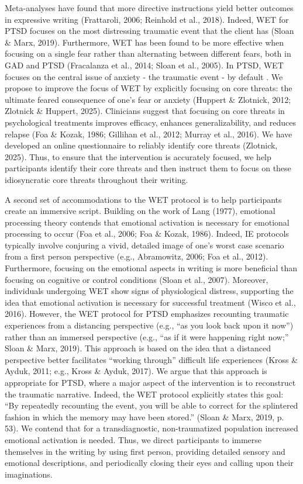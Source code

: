 \documentclass[
  man,floatsintext]{apa7}
\begin{document}
Meta-analyses have found that more directive instructions yield better outcomes in expressive writing (Frattaroli, 2006; Reinhold et al., 2018).
Indeed, WET for PTSD focuses on the most distressing traumatic event that the client has (Sloan \& Marx, 2019).
Furthermore, WET has been found to be more effective when focusing on a single fear rather than alternating between different fears, both in GAD and PTSD (Fracalanza et al., 2014; Sloan et al., 2005).
In PTSD, WET focuses on the central issue of anxiety - the traumatic event - by default .
We propose to improve the focus of WET by explicitly focusing on core threats: the ultimate feared consequence of one's fear or anxiety (Huppert \& Zlotnick, 2012; Zlotnick \& Huppert, 2025).
Clinicians suggest that focusing on core threats in psychological treatments improves efficacy, enhances generalizability, and reduces relapse
(Foa \& Kozak, 1986; Gillihan et al., 2012; Murray et al., 2016).
We have developed an online questionnaire to reliably identify core threats (Zlotnick, 2025).
Thus, to ensure that the intervention is accurately focused, we help participants identify their core threats and then instruct them to focus on these idiosyncratic core threats throughout their writing.

A second set of accommodations to the WET protocol is to help participants create an immersive script.
Building on the work of Lang (1977), emotional processing theory contends that
emotional activation is necessary for emotional processing to occur (Foa et al., 2006; Foa \& Kozak, 1986).
Indeed, IE protocols typically involve conjuring a vivid, detailed image of one's worst case scenario from a first person perspective (e.g., Abramowitz, 2006; Foa et al., 2012).
Furthermore, focusing on the emotional aspects in writing is more beneficial than focusing on cognitive or control conditions (Sloan et al., 2007).
Moreover, individuals undergoing WET show signs of physiological distress, supporting the idea that emotional activation is necessary for successful treatment (Wisco et al., 2016).
However, the WET protocol for PTSD emphasizes recounting traumatic experiences from a distancing perspective (e.g., ``as you look back upon it now'') rather than an immersed perspective (e.g., ``as if it were happening right now;'' Sloan \& Marx, 2019).
This approach is based on the idea that a distanced perspective better facilitates ``working through'' difficult life experiences (Kross \& Ayduk, 2011; e.g., Kross \& Ayduk, 2017).
We argue that this approach is appropriate for PTSD, where a major aspect of the intervention is to reconstruct the traumatic narrative.
Indeed, the WET protocol explicitly states this goal: ``By repeatedly recounting the event, you will be able to correct for the splintered fashion in which the memory may have been stored.'' (Sloan \& Marx, 2019, p. 53).
We contend that for a transdiagnostic, non-traumatized population increased emotional activation is needed.
Thus, we direct participants to immerse themselves in the writing by using first person, providing detailed sensory and emotional descriptions, and periodically closing their eyes and calling upon their imaginations.
\end{document}
